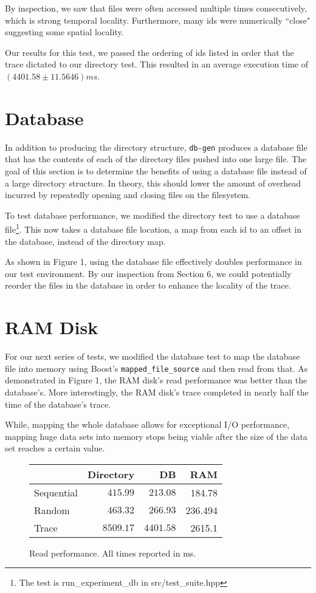 \documentclass[notitlepage, twocolumn]{article}
\begin{document}
By inspection, we saw that files were often accessed multiple times consecutively, which is strong temporal locality.
Furthermore, many ids were numerically ``close" suggesting some spatial locality.

Our results for this test, we passed the ordering of ids listed in order that the trace dictated to our directory test.
This resulted in an average execution time of $(4401.58 \pm 11.5646)ms$.

\section{Database}

In addition to producing the directory structure, \verb|db-gen| produces a database file that has the contents of each of the directory files pushed into one large file.
The goal of this section is to determine the benefits of using a database file instead of a large directory structure.
In theory, this should lower the amount of overhead incurred by repeatedly opening and closing files on the filesystem.

To test database performance, we modified the directory test to use a database file\footnote{The test is run\_experiment\_db in src/test\_suite.hpp}.
This now takes a database file location, a map from each id to an offset in the database, instead of the directory map.

As shown in Figure 1, using the database file effectively doubles performance in our test environment.
By our inspection from Section 6, we could potentially reorder the files in the database in order to enhance the locality of the trace.

\section{RAM Disk}

For our next series of tests, we modified the database test to map the database file into memory using Boost's \verb|mapped_file_source| and then read from that.
As demonstrated in Figure 1, the RAM disk's read performance was better than the database's.
More interestingly, the RAM disk's trace completed in nearly half the time of the database's trace.

While, mapping the whole database allows for exceptional I/O performance, mapping huge data sets into memory stops being viable after the size of the data set reaches a certain value.

\begin{figure}
\centering
\begin{tabular}{l|r|r|r}
&Directory&DB&RAM\\\hline
Sequential&$415.99$&$213.08$&184.78\\\hline
Random&$463.32$&$266.93$&236.494\\\hline
Trace&$8509.17$&$4401.58$&2615.1
\end{tabular}
\caption{Read performance. All times reported in ms.}
\end{figure}
\end{document}
